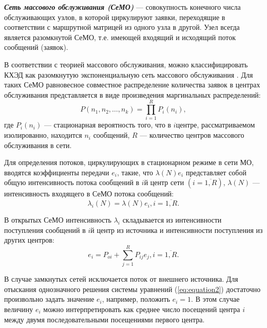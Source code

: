 \vspace{\baselineskip}
\textbf{\textit{Сеть массового обслуживания (СеМО)}} --- совокупность конечного числа обслуживающих узлов, в которой циркулируют заявки, переходящие в соответствии с маршрутной матрицей из одного узла в другой. Узел всегда является разомкнутой СеМО, т.е. имеющей входящий и исходящий поток сообщений (заявок).

\vspace{\baselineskip}
В соответствии с теорией массового обслуживания, можно классифицировать КХЭД как разомкнутую экспоненциальную сеть массового обслуживания \cite{bykov}. Для таких СеМО равновесное совместное распределение количества заявок в центрах обслуживания представляется в виде произведения маргинальных распределений:
\begin{equation}
  \label{eq:equation1}
  P(n_1,n_2,\ldots,n_k) = \prod_{i=1}^R P_i(n_i),
\end{equation}
где $P_i(n_i)$ --- стационарная вероятность того, что в $i$ центре, рассматриваемом изолированно, находится  $n_i$ сообщений, $R$ --- количество центров массового обслуживания в сети.

\vspace{\baselineskip}
Для определения потоков, циркулирующих в стационарном режиме в сети МО, вводятся коэффициенты передачи  $e_i$, такие, что $\lambda(N)e_i$ представляет собой общую интенсивность потока сообщений в $i$\ndash й центр сети $(i=\overline{1,R})$, $\lambda(N)$ --- интенсивность входящего в СеМО потока сообщений:
\begin{equation}
  \label{eq:transmission}
\lambda_i(N)=\lambda(N)e_i, i=\overline{1,R}.
\end{equation}

В открытых СеМО интенсивность  $\lambda_i$ складывается из интенсивности поступления сообщений в $i$\ndash й центр из источника и интенсивности поступления из других центров:
\begin{equation}
  \label{eq:equation2}
e_i = P_{oi} + \sum_{j=1}^R P_{ij}e_j, i=\overline{1,R}.
\end{equation}

В случае замкнутых сетей исключается поток от внешнего источника. Для отыскания однозначного решения системы уравнений (\ref{eq:equation2}) достаточно произвольно задать значение $e_i$, например, положить $e_i=1$. В этом случае величину $e_i$ можно интерпретировать как среднее число посещений центра $i$ между двумя последовательными посещениями первого центра.

